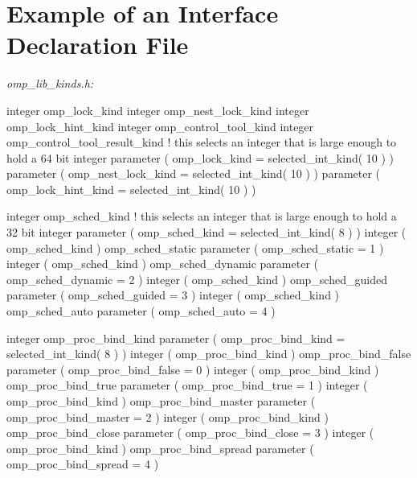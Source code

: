 \pagebreak

{\section{Example of an Interface Declaration  File}}
\label{sec:Example of an Interface Declaration include File}
\emph{omp\_lib\_kinds.h:}
{\small \begin{codepar}

     integer omp\_lock\_kind
     integer omp\_nest\_lock\_kind
     integer omp\_lock\_hint\_kind
     integer omp\_control\_tool\_kind
     integer omp\_control\_tool\_result\_kind
! this selects an integer that is large enough to hold a 64 bit integer
     parameter ( omp\_lock\_kind = selected\_int\_kind( 10 ) )
     parameter ( omp\_nest\_lock\_kind = selected\_int\_kind( 10 ) )
     parameter ( omp\_lock\_hint\_kind = selected\_int\_kind( 10 ) )
     
     integer omp\_sched\_kind
! this selects an integer that is large enough to hold a 32 bit integer
     parameter ( omp\_sched\_kind = selected\_int\_kind( 8 ) )
     integer ( omp\_sched\_kind ) omp\_sched\_static
     parameter ( omp\_sched\_static = 1 )
     integer ( omp\_sched\_kind ) omp\_sched\_dynamic
     parameter ( omp\_sched\_dynamic = 2 )
     integer ( omp\_sched\_kind ) omp\_sched\_guided
     parameter ( omp\_sched\_guided = 3 )
     integer ( omp\_sched\_kind ) omp\_sched\_auto
     parameter ( omp\_sched\_auto = 4 )
     
     integer omp\_proc\_bind\_kind
     parameter ( omp\_proc\_bind\_kind = selected\_int\_kind( 8 ) )
     integer ( omp\_proc\_bind\_kind ) omp\_proc\_bind\_false
     parameter ( omp\_proc\_bind\_false = 0 )
     integer ( omp\_proc\_bind\_kind ) omp\_proc\_bind\_true
     parameter ( omp\_proc\_bind\_true = 1 )
     integer ( omp\_proc\_bind\_kind ) omp\_proc\_bind\_master
     parameter ( omp\_proc\_bind\_master = 2 )
     integer ( omp\_proc\_bind\_kind ) omp\_proc\_bind\_close
     parameter ( omp\_proc\_bind\_close = 3 )
     integer ( omp\_proc\_bind\_kind ) omp\_proc\_bind\_spread
     parameter ( omp\_proc\_bind\_spread = 4 )


\end{codepar}}
